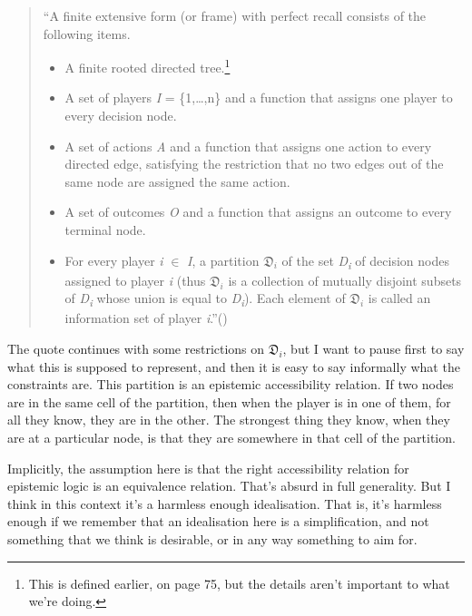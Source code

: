 \documentclass[
  12pt,
  letterpaper,
  DIV=11,
  numbers=noendperiod]{scrreprt}
\providecommand{\tightlist}{%
  \setlength{\itemsep}{0pt}\setlength{\parskip}{0pt}}\usepackage{longtable,booktabs,array}
\begin{document}
\begin{quote}
``A finite extensive form (or frame) with perfect recall consists of the
following items.

\begin{itemize}
\tightlist
\item
  A finite rooted directed tree.\footnote{This is defined earlier, on
    page 75, but the details aren't important to what we're doing.}
\item
  A set of players \emph{I} = \{1,\ldots,n\} and a function that assigns
  one player to every decision node.
\item
  A set of actions \emph{A} and a function that assigns one action to
  every directed edge, satisfying the restriction that no two edges out
  of the same node are assigned the same action.
\item
  A set of outcomes \emph{O} and a function that assigns an outcome to
  every terminal node.
\item
  For every player \emph{i} \(\in\) \emph{I}, a partition
  \(\mathfrak{D}_i\) of the set \emph{D\textsubscript{i}} of decision
  nodes assigned to player \emph{i} (thus \(\mathfrak{D}_i\) is a
  collection of mutually disjoint subsets of \emph{D\textsubscript{i}}
  whose union is equal to \emph{D\textsubscript{i}}). Each element of
  \(\mathfrak{D}_i\) is called an information set of player
  \emph{i}.''()
\end{itemize}
\end{quote}

The quote continues with some restrictions on \(\mathfrak{D}_i\), but I
want to pause first to say what this is supposed to represent, and then
it is easy to say informally what the constraints are. This partition is
an epistemic accessibility relation. If two nodes are in the same cell
of the partition, then when the player is in one of them, for all they
know, they are in the other. The strongest thing they know, when they
are at a particular node, is that they are somewhere in that cell of the
partition.

Implicitly, the assumption here is that the right accessibility relation
for epistemic logic is an equivalence relation. That's absurd in full
generality. But I think in this context it's a harmless enough
idealisation. That is, it's harmless enough if we remember that an
idealisation here is a simplification, and not something that we think
is desirable, or in any way something to aim for.
\end{document}

